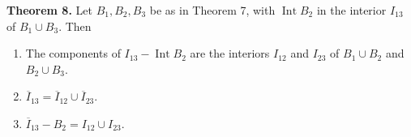 \textbf{Theorem 8.} Let $B_1, B_2, B_3$ be as in Theorem 7, with $\operatorname{Int} B_2$ in the interior $I_{13}$ of $B_1 \cup B_3$. Then
\begin{enumerate}
\item[(1)] The components of $I_{13} - \operatorname{Int} B_2$ are the interiors $I_{12}$ and $I_{23}$ of $B_1 \cup B_2$ and $B_2 \cup B_3$.
\item[(2)] $\overline{I}_{13} = \overline{I}_{12} \cup \overline{I}_{23}$.
\item[(3)] $\overline{I}_{13} - B_2 = I_{12} \cup I_{23}$.
\end{enumerate}

